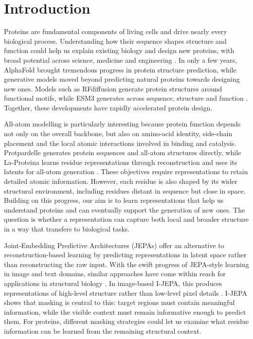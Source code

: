 \section{Introduction}
\label{sec:introduction}

Proteins are fundamental components of living cells and drive nearly every biological process. Understanding how their sequence shapes structure and function could help us explain existing biology and design new proteins, with broad potential across science, medicine and engineering \citep{huang2016coming,kuhlman2019advances}. In only a few years, AlphaFold brought tremendous progress in protein structure prediction, while generative models moved beyond predicting natural proteins towards designing new ones. Models such as RFdiffusion generate protein structures around functional motifs, while ESM3 generates across sequence, structure and function \citep{jumper2021,watson2023rfdiffusion,hayes2025esm3}. Together, these developments have rapidly accelerated protein design.

All-atom modelling is particularly interesting because protein function depends not only on the overall backbone, but also on amino-acid identity, side-chain placement and the local atomic interactions involved in binding and catalysis. Protpardelle generates protein sequences and all-atom structures directly, while La-Proteina learns residue representations through reconstruction and uses its latents for all-atom generation \citep{chu2024allatom,la-proteina}. These objectives require representations to retain detailed atomic information. However, each residue is also shaped by its wider structural environment, including residues distant in sequence but close in space. Building on this progress, our aim is to learn representations that help us understand proteins and can eventually support the generation of new ones. The question is whether a representation can capture both local and broader structure in a way that transfers to biological tasks.

Joint-Embedding Predictive Architectures (JEPAs) offer an alternative to reconstruction-based learning by predicting representations in latent space rather than reconstructing the raw input. With the swift progress of JEPA-style learning in image and text domains, similar approaches have come within reach for applications in structural biology \citep{assran2023ijepa,balestriero2025lejepa}. In image-based I-JEPA, this produces representations of high-level structure rather than low-level pixel details \citep{assran2023ijepa}. I-JEPA shows that masking is central to this: target regions must contain meaningful information, while the visible context must remain informative enough to predict them. For proteins, different masking strategies could let us examine what residue information can be learned from the remaining structural context.

